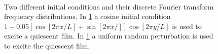 \documentclass[a4paper,12pt]{article}
\begin{document}
  \begin{figure} 
   \centering
     \\
   \caption{Two different initial conditions and their discrete Fourier transform frequency distributions. In \ref{fig_ic} a cosine initial condition $1 - 0.05 \left[ \cos [2 \pi x/L] + \sin [2 \pi x/]\right] \cos[2 \pi y/L]$ is used to excite a quiescent film. In \ref{fig_ic}  a uniform random perturbation is used to excite the quiescent film.}
   \label{fig_ic}
  \end{figure}
\end{document}
